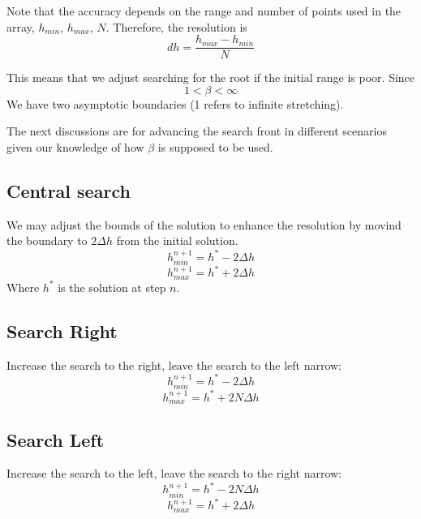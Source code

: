 \documentclass[11pt]{article}
\begin{document}
Note that the accuracy depends on the range and number of points used in the array, $h_{min}$, $h_{max}$, $N$. Therefore, the resolution is
\begin{equation}
	dh = \frac{h_{max}-h_{min}}{N}
\end{equation}

This means that we adjust searching for the root if the initial range is poor. 
Since
\begin{equation}
	1 < \beta < \infty
\end{equation}
We have two asymptotic boundaries (1 refers to infinite stretching). 

The next discussions are for advancing the search front in different scenarios given our knowledge of how $\beta$ is supposed to be used.

\subsection{Central search}
We may adjust the bounds of the solution to enhance the resolution by movind the boundary to $2 \Delta h$ from the initial solution.
\begin{equation}
	h_{min}^{n+1} = h^* - 2\Delta h
\end{equation}
\begin{equation}
	h_{max}^{n+1} = h^* + 2\Delta h
\end{equation}
Where $h^*$ is the solution at step $n$.

\subsection{Search Right}
Increase the search to the right, leave the search to the left narrow:
\begin{equation}
	h_{min}^{n+1} = h^* - 2\Delta h
\end{equation}
\begin{equation}
	h_{max}^{n+1} = h^* + 2N\Delta h
\end{equation}

\subsection{Search Left}
Increase the search to the left, leave the search to the right narrow:
\begin{equation}
	h_{min}^{n+1} = h^* - 2N\Delta h
\end{equation}
\begin{equation}
	h_{max}^{n+1} = h^* + 2\Delta h
\end{equation}
\end{document}
